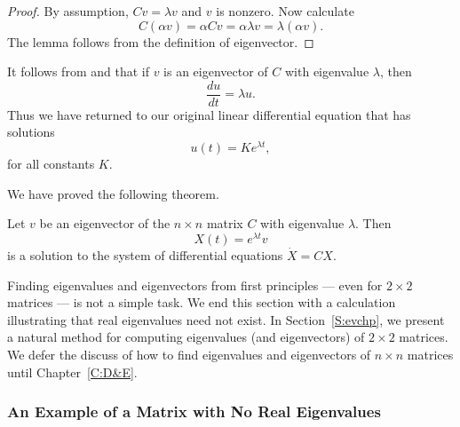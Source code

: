 \documentclass{ximera}
\begin{document}
\begin{proof} By assumption, $Cv=\lambda v$ and $v$ is nonzero. Now calculate
\[
C(\alpha v) = \alpha Cv = \alpha\lambda v = \lambda(\alpha v).
\]
The lemma follows from the definition of eigenvector.  \end{proof}

It follows from  and  that if $v$ is
an eigenvector of $C$ with eigenvalue $\lambda$, then
\[
\frac{du}{dt} = \lambda u.
\]
Thus we have returned to our original linear differential
equation that has solutions
\[
u(t) = Ke^{\lambda t},
\]
for all constants $K$.

We have proved the following theorem.
\begin{thm}  \label{T:eigensoln}
Let $v$ be an eigenvector of the $n\times n$ matrix $C$ with
eigenvalue $\lambda$.  Then
\[
X(t) = e^{\lambda t}v
\]
is a solution to the system of differential equations $\dot{X}=CX$.
\end{thm}



Finding eigenvalues and eigenvectors from first principles --- even for 
$2\times 2$ matrices --- is not a simple task.  We end this section with 
a calculation illustrating that real eigenvalues need not exist.  In 
Section~\ref{S:evchp}, we present a natural method for computing  
eigenvalues (and eigenvectors) of $2\times2$ matrices.  We defer the 
discuss of how to find eigenvalues and eigenvectors of $n\times n$ matrices 
until Chapter~\ref{C:D&E}.


\subsubsection*{An Example of a Matrix with No Real Eigenvalues}
\end{document}
